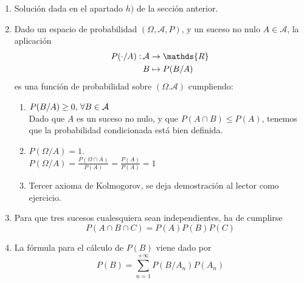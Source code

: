 \documentclass[fleqn]{article}
\def\R{\mathds{R}}
\begin{document}
\begin{enumerate}
                        \begin{enumerate}
                                \item Solución dada en el apartado $h)$ de la sección anterior.
                                \item Dado un espacio de probabilidad $(\Omega, \mathcal{A}, P)$, y un suceso no nulo $A\in \mathcal{A}$, la aplicación
                                        $$
                                        \begin{aligned}
                                                P(\cdot/A) : \thinspace &\mathcal{A} \rightarrow \R \\
                                                                        &B \mapsto P(B/A)
                                        \end{aligned}
                                        $$
                                        es una función de probabilidad sobre $(\Omega. \mathcal{A}) $ cumpliendo:
                                        \begin{enumerate}
                                                \item $P(B/A) \geq 0, \thinspace \forall B \in \mathcal{A}$ \\
                                                        Dado que $A$ es un suceso no nulo, y que $P(A\cap B) \leq P(A)$, tenemos que la probabilidad condicionada
                                                        está bien definida.
                                                \item $P(\Omega/A)=1$.\\
                                                        $P(\Omega/A) = \frac{P(\Omega \cap A)}{P(A)} = \frac{P(A)}{P(A)} = 1$
                                                \item Tercer axioma de Kolmogorov, se deja demostración al lector como ejercicio.
                                        \end{enumerate}
                                \item Para que tres sucesos cualesquiera sean independientes, ha de cumplirse
                                        $$P(A\cap B \cap C)=P(A)P(B)P(C)$$
                                \item La fórmula para el cálculo de $P(B)$ viene dado por 
                                        $$P(B) = \sum_{n=1}^{+\infty} P(B/A_n)P(A_n)$$
                        \end{enumerate}
        
        \end{enumerate}
        
\end{document}
